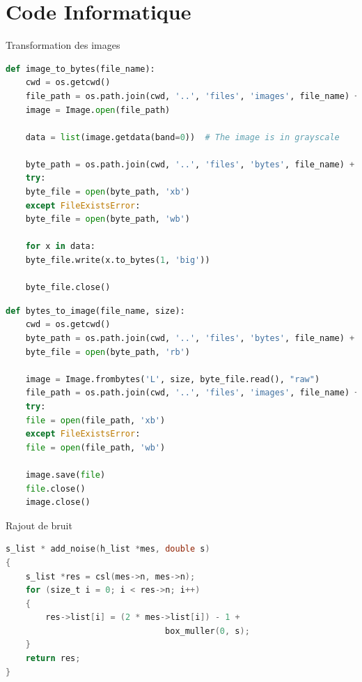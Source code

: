 \documentclass[11pt]{beamer}
\begin{document}
\begin{frame}[plain]
	\printbibliography[title={Bibliographie}]
\end{frame}


\section{Code Informatique}


\begin{frame}{Transformation des images}
	\begin{lstlisting}[language=Python]
def image_to_bytes(file_name):
	cwd = os.getcwd()
	file_path = os.path.join(cwd, '..', 'files', 'images', file_name) + '.png'
	image = Image.open(file_path)
	
	data = list(image.getdata(band=0))  # The image is in grayscale
	
	byte_path = os.path.join(cwd, '..', 'files', 'bytes', file_name) + '.bt'
	try:
	byte_file = open(byte_path, 'xb')
	except FileExistsError:
	byte_file = open(byte_path, 'wb')
	
	for x in data:
	byte_file.write(x.to_bytes(1, 'big'))
	
	byte_file.close()
	\end{lstlisting}
\end{frame}

\begin{frame}
	\begin{lstlisting}[language=Python]
def bytes_to_image(file_name, size):
	cwd = os.getcwd()
	byte_path = os.path.join(cwd, '..', 'files', 'bytes', file_name) + '.bt'
	byte_file = open(byte_path, 'rb')
	
	image = Image.frombytes('L', size, byte_file.read(), "raw")
	file_path = os.path.join(cwd, '..', 'files', 'images', file_name) + '.png'
	try:
	file = open(file_path, 'xb')
	except FileExistsError:
	file = open(file_path, 'wb')
	
	image.save(file)
	file.close()
	image.close()	
	\end{lstlisting}
\end{frame}

\begin{frame}{Rajout de bruit}
	\begin{lstlisting}[language=C]
s_list * add_noise(h_list *mes, double s)
{
	s_list *res = csl(mes->n, mes->n);
	for (size_t i = 0; i < res->n; i++)
	{
		res->list[i] = (2 * mes->list[i]) - 1 + 
								box_muller(0, s);
	}
	return res;
}
	\end{lstlisting}
\end{frame}
\end{document}
